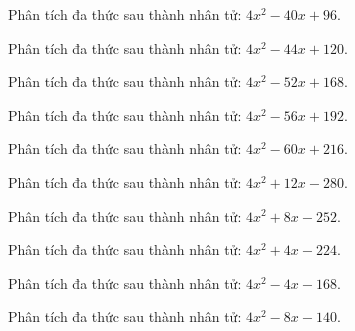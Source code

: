 \begin{bt}
	Phân tích đa thức sau thành nhân tử: $4 x^2 - 40 x + 96$.
\end{bt}
\begin{bt}
	Phân tích đa thức sau thành nhân tử: $4 x^2 - 44 x + 120$.
\end{bt}
\begin{bt}
	Phân tích đa thức sau thành nhân tử: $4 x^2 - 52 x + 168$.
\end{bt}
\begin{bt}
	Phân tích đa thức sau thành nhân tử: $4 x^2 - 56 x + 192$.
\end{bt}
\begin{bt}
	Phân tích đa thức sau thành nhân tử: $4 x^2 - 60 x + 216$.
\end{bt}
\begin{bt}
	Phân tích đa thức sau thành nhân tử: $4 x^2 + 12 x - 280$.
\end{bt}
\begin{bt}
	Phân tích đa thức sau thành nhân tử: $4 x^2 + 8 x - 252$.
\end{bt}
\begin{bt}
	Phân tích đa thức sau thành nhân tử: $4 x^2 + 4 x - 224$.
\end{bt}
\begin{bt}
	Phân tích đa thức sau thành nhân tử: $4 x^2 - 4 x - 168$.
\end{bt}
\begin{bt}
	Phân tích đa thức sau thành nhân tử: $4 x^2 - 8 x - 140$.
\end{bt}
